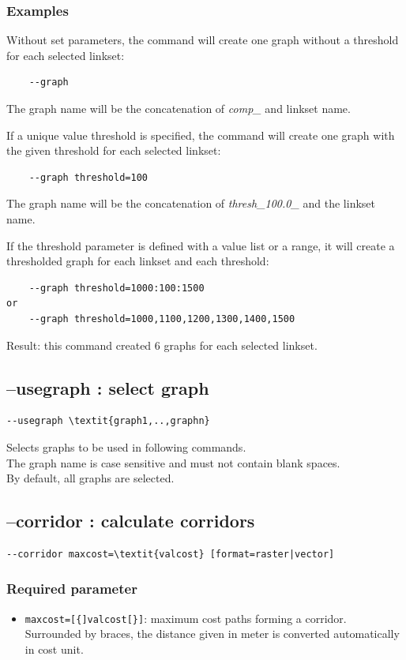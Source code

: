 \documentclass[a4paper,10pt]{report}
\begin{document}
\subsubsection{Examples}
Without set parameters, the command will create one graph without a threshold for each selected linkset:
\begin{Verbatim}
	--graph
\end{Verbatim}
The graph name will be the concatenation of \textit{comp\_} and linkset name.

If a unique value threshold is specified, the command will create one graph with the given threshold for each selected linkset:
\begin{Verbatim}
	--graph threshold=100
\end{Verbatim}
The graph name will be the concatenation of \textit{thresh\_100.0\_} and the linkset name.

If the threshold parameter is defined with a value list or a range, it will create a thresholded graph for each linkset and each threshold:
\begin{Verbatim}
	--graph threshold=1000:100:1500
or
	--graph threshold=1000,1100,1200,1300,1400,1500
\end{Verbatim}
Result: this command created 6 graphs for each selected linkset.


\subsection{--usegraph : select graph}
\label{usegraph}
\begin{Verbatim}[commandchars=\\\{\}]
--usegraph \textit{graph1,..,graphn}
\end{Verbatim}
Selects graphs to be used in following commands.\\
The graph name is case sensitive and must not contain blank spaces.\\
By default, all graphs are selected.

\subsection{--corridor : calculate corridors}
\begin{Verbatim}[commandchars=\\\{\}]
--corridor maxcost=\textit{valcost} [format=raster|vector]
\end{Verbatim}

\subsubsection{Required parameter}
\begin{itemize}
	\item \verb|maxcost=[{]valcost[}]|: maximum cost paths forming a corridor. Surrounded by braces, the distance given in meter is converted automatically in cost unit.
\end{itemize}
\end{document}
